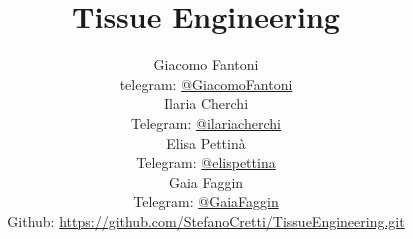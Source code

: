 
\title{\Huge\textbf{Tissue Engineering}}
\author{
  Giacomo Fantoni \\
  \small telegram: \href{https://t.me/GiacomoFantoni}{@GiacomoFantoni} \\[3pt]
  Ilaria Cherchi\\
  \small Telegram: \href{https://t.me/ilariacherchi}{@ilariacherchi} \\[3pt]
  Elisa Pettin\`a\\
  \small Telegram: \href{https://t.me/elisapettina}{@elispettina} \\[3pt]
  Gaia Faggin\\
  \small Telegram: \href{https://t.me/GaiaFaggin}{@GaiaFaggin} \\[3pt]
\small Github: \href{https://github.com/StefanoCretti/TissueEngineering.git}{https://github.com/StefanoCretti/TissueEngineering.git}}


\maketitle
\tableofcontents

    
    
    
    
    
    
    
    
    
    
    


